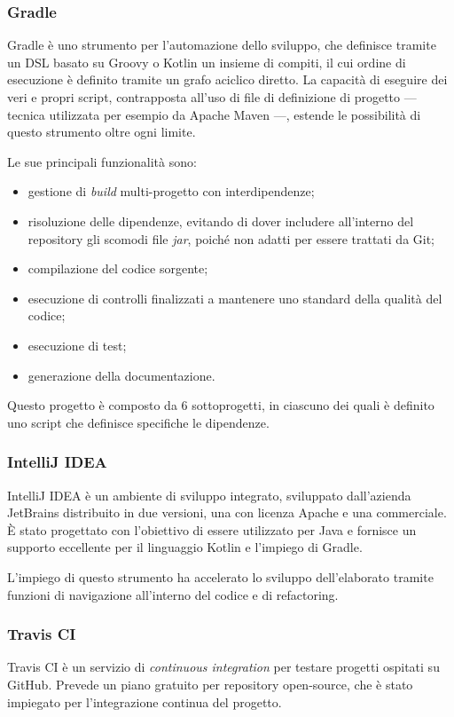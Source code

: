 \subsubsection{Gradle}
Gradle è uno strumento per l'automazione dello sviluppo, che definisce tramite
un DSL basato su Groovy o Kotlin un insieme di compiti, il cui ordine di
esecuzione è definito tramite un grafo aciclico diretto. La capacità di eseguire
dei veri e propri script, contrapposta all'uso di file di definizione di
progetto --- tecnica utilizzata per esempio da Apache Maven ---, estende le
possibilità di questo strumento oltre ogni limite.

Le sue principali funzionalità sono:

\begin{itemize}
\item{gestione di \textit{build} multi-progetto con interdipendenze;}
\item{risoluzione delle dipendenze, evitando di dover includere all'interno del
    repository gli scomodi file \textit{jar}, poiché non adatti per essere
    trattati da Git;}
\item{compilazione del codice sorgente;}
\item{esecuzione di controlli finalizzati a mantenere uno standard della qualità
    del codice;}
\item{esecuzione di test;}
\item{generazione della documentazione.}
\end{itemize}

Questo progetto è composto da 6 sottoprogetti, in ciascuno dei quali è definito
uno script che definisce specifiche le dipendenze.

\subsubsection{IntelliJ IDEA}

IntelliJ IDEA è un ambiente di sviluppo integrato, sviluppato dall'azienda
JetBrains distribuito in due versioni, una con licenza Apache e una commerciale.
È stato progettato con l'obiettivo di essere utilizzato per Java e fornisce un
supporto eccellente per il linguaggio Kotlin e l'impiego di Gradle.

L'impiego di questo strumento ha accelerato lo sviluppo dell'elaborato tramite
funzioni di navigazione all'interno del codice e di refactoring.

\subsubsection{Travis CI}
Travis CI è un servizio di \textit{continuous integration} per testare progetti
ospitati su GitHub. Prevede un piano gratuito per repository open-source, che è
stato impiegato per l'integrazione continua del progetto.

